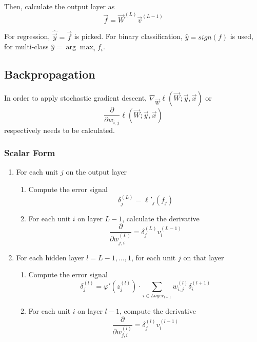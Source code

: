 Then, calculate the output layer as
\begin{equation*}
    \vec{f} = \vec{W}^{(L)} \vec{v}^{(L-1)}
\end{equation*}

For regression, $\hat{\vec{y}} = \vec{f}$ is picked.
For binary classification, $\hat{y} = sign(f)$ is used,
for multi-class $\hat{y} = \arg\max_i{f_i}$.


\subsection{Backpropagation}
In order to apply stochastic gradient descent,
$\nabla_{\vec{W}} \ell(\vec{W}; \vec{y}, \vec{x})$
or
\begin{equation*}
    \frac{\partial}{\partial w_{i,j}}
    \ell(\vec{W}; \vec{y}, \vec{x})
\end{equation*}
respectively needs to be calculated.

\subsubsection{Scalar Form}
\begin{enumerate}
    \item For each unit $j$ on the output layer
    \begin{enumerate}
        \item Compute the error signal
        \begin{equation*}
            \delta_j^{(L)} = \ell'_j(f_j)
        \end{equation*}
        \item For each unit $i$ on layer $L - 1$,
        calculate the derivative
        \begin{equation*}
            \frac{\partial}{\partial w_{j,i}^{(L)}} = \delta_j^{(L)} v_i^{(L - 1)}
        \end{equation*}
    \end{enumerate}
    
    \item For each hidden layer $l = L - 1, \dotsc, 1$,
    for each unit $j$ on that layer
    \begin{enumerate}
        \item Compute the error signal
        \begin{equation*}
            \delta_j^{(l)} = \varphi'(z_j^{(l)}) \cdot
            \sum_{i \in Layer_{l+1}}{w_{i,j}^{(l)} \delta_i^{(l+1)}}
        \end{equation*}
        \item For each unit $i$ on layer $l - 1$,
        compute the derivative
        \begin{equation*}
            \frac{\partial}{\partial w_{j,i}^{(l)}} = \delta_j^{(l)} v_i^{(l-1)}
        \end{equation*}
    \end{enumerate}
\end{enumerate}

